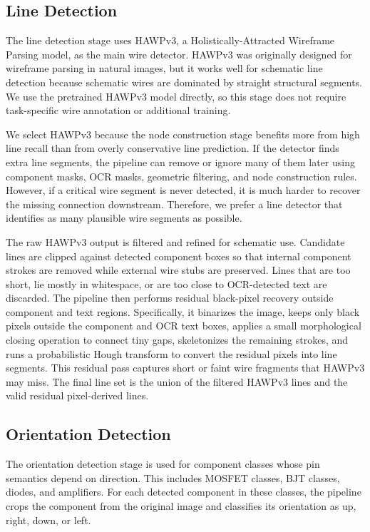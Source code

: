 \subsection{Line Detection}
\label{subsec:line-detection}

The line detection stage uses HAWPv3, a Holistically-Attracted Wireframe Parsing model, as the main wire detector. HAWPv3 was originally designed for wireframe parsing in natural images, but it works well for schematic line detection because schematic wires are dominated by straight structural segments. We use the pretrained HAWPv3 model directly, so this stage does not require task-specific wire annotation or additional training.

We select HAWPv3 because the node construction stage benefits more from high line recall than from overly conservative line prediction. If the detector finds extra line segments, the pipeline can remove or ignore many of them later using component masks, OCR masks, geometric filtering, and node construction rules. However, if a critical wire segment is never detected, it is much harder to recover the missing connection downstream. Therefore, we prefer a line detector that identifies as many plausible wire segments as possible.

The raw HAWPv3 output is filtered and refined for schematic use. Candidate lines are clipped against detected component boxes so that internal component strokes are removed while external wire stubs are preserved. Lines that are too short, lie mostly in whitespace, or are too close to OCR-detected text are discarded. The pipeline then performs residual black-pixel recovery outside component and text regions. Specifically, it binarizes the image, keeps only black pixels outside the component and OCR text boxes, applies a small morphological closing operation to connect tiny gaps, skeletonizes the remaining strokes, and runs a probabilistic Hough transform to convert the residual pixels into line segments. This residual pass captures short or faint wire fragments that HAWPv3 may miss. The final line set is the union of the filtered HAWPv3 lines and the valid residual pixel-derived lines.

\subsection{Orientation Detection}
\label{subsec:orientation-detection}

The orientation detection stage is used for component classes whose pin semantics depend on direction. This includes MOSFET classes, BJT classes, diodes, and amplifiers. For each detected component in these classes, the pipeline crops the component from the original image and classifies its orientation as up, right, down, or left.

